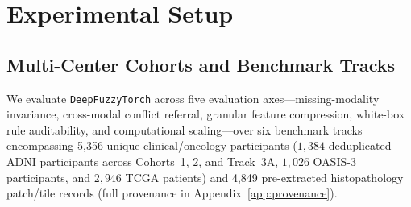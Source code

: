 \documentclass[10pt,twocolumn]{article}
\begin{document}
\section{Experimental Setup}
\label{sec:experiments}

\subsection{Multi-Center Cohorts and Benchmark Tracks}
\label{sec:cohorts}
We evaluate \texttt{DeepFuzzyTorch} across five evaluation axes---missing-modality invariance,
cross-modal conflict referral, granular feature compression, white-box rule auditability, and
computational scaling---over six benchmark tracks encompassing 5,356 unique clinical/oncology
participants ($1,384$ deduplicated ADNI participants across Cohorts~1, 2, and Track~3A, $1,026$
OASIS-3 participants, and $2,946$ TCGA patients) and 4,849 pre-extracted histopathology
patch/tile records (full provenance in Appendix~\ref{app:provenance}).
\end{document}
